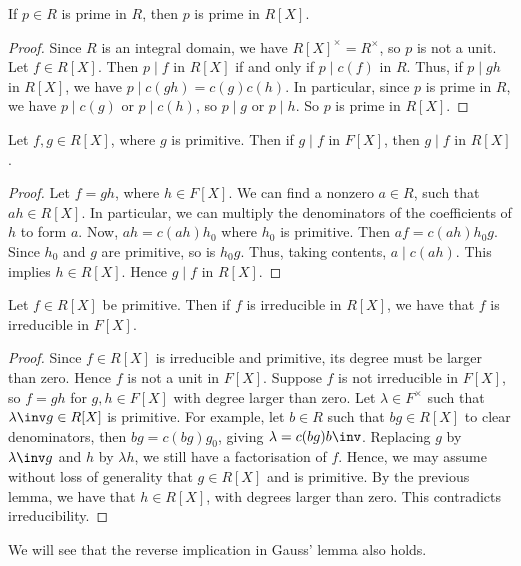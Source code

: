 \begin{corollary}
	If $p \in R$ is prime in $R$, then $p$ is prime in $R[X]$.
\end{corollary}
\begin{proof}
	Since $R$ is an integral domain, we have $R[X]^\times = R^\times$, so $p$ is not a unit.
	Let $f \in R[X]$.
	Then $p \mid f$ in $R[X]$ if and only if $p \mid c(f)$ in $R$.
	Thus, if $p \mid gh$ in $R[X]$, we have $p \mid c(gh) = c(g) c(h)$.
	In particular, since $p$ is prime in $R$, we have $p \mid c(g)$ or $p \mid c(h)$, so $p \mid g$ or $p \mid h$.
	So $p$ is prime in $R[X]$.
\end{proof}
\begin{lemma}
	Let $f,g \in R[X]$, where $g$ is primitive.
	Then if $g \mid f$ in $F[X]$, then $g \mid f$ in $R[X]$.
\end{lemma}
\begin{proof}
	Let $f = gh$, where $h \in F[X]$.
	We can find a nonzero $a \in R$, such that $ah \in R[X]$.
	In particular, we can multiply the denominators of the coefficients of $h$ to form $a$.
	Now, $ah = c(ah) h_0$ where $h_0$ is primitive.
	Then $af = c(ah) h_0 g$.
	Since $h_0$ and $g$ are primitive, so is $h_0 g$.
	Thus, taking contents, $a \mid c(ah)$.
	This implies $h \in R[X]$.
	Hence $g \mid f$ in $R[X]$.
\end{proof}
\begin{lemma}
	Let $f \in R[X]$ be primitive.
	Then if $f$ is irreducible in $R[X]$, we have that $f$ is irreducible in $F[X]$.
\end{lemma}
\begin{proof}
	Since $f \in R[X]$ is irreducible and primitive, its degree must be larger than zero.
	Hence $f$ is not a unit in $F[X]$.
	Suppose $f$ is not irreducible in $F[X]$, so $f = gh$ for $g,h \in F[X]$ with degree larger than zero.
	Let $\lambda \in F^\times$ such that $\lambda\inv g \in R[X]$ is primitive.
	For example, let $b \in R$ such that $bg \in R[X]$ to clear denominators, then $bg = c(bg) g_0$, giving $\lambda = c(bg) b\inv$.
	Replacing $g$ by $\lambda\inv g$ and $h$ by $\lambda h$, we still have a factorisation of $f$.
	Hence, we may assume without loss of generality that $g \in R[X]$ and is primitive.
	By the previous lemma, we have that $h \in R[X]$, with degrees larger than zero.
	This contradicts irreducibility.
\end{proof}
\begin{remark}
	We will see that the reverse implication in Gauss' lemma also holds.
\end{remark}
